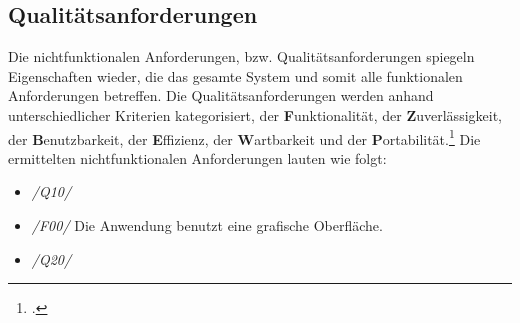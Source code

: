 \subsection{Qualitätsanforderungen}
Die nichtfunktionalen Anforderungen, bzw. Qualitätsanforderungen spiegeln Eigenschaften wieder, die das gesamte System und somit alle funktionalen Anforderungen betreffen. Die Qualitätsanforderungen werden anhand unterschiedlicher Kriterien kategorisiert, der \textbf{F}unktionalität, der \textbf{Z}uverlässigkeit, der \textbf{B}enutzbarkeit, der \textbf{E}ffizienz, der \textbf{W}artbarkeit und der \textbf{P}ortabilität.\footcite[Vgl.][S. 494 f.]{balzert} Die ermittelten nichtfunktionalen Anforderungen lauten wie folgt:
\begin{itemize}
    \item[] \emph{/Q10/}
    \item[] \emph{/F00/} Die Anwendung benutzt eine grafische Oberfläche.
    \vspace{0.5cm}
    \item[] \emph{/Q20/}
\end{itemize}

